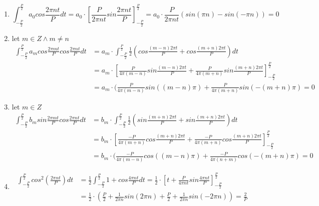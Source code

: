 \documentclass{article}
\begin{document}
    \begin{enumerate}
        \item \begin{equation*}
                \int_{-\frac{P}{2}}^{\frac{P}{2}}a_0cos\frac{2\pi nt}{P}dt
                = a_0 \cdot \left[\frac{P}{2\pi nt}sin\frac{2\pi nt}{P}\right]_{-\frac{P}{2}}^{\frac{P}{2}}
                = a_0 \cdot \frac{P}{2\pi nt}(sin(\pi n) - sin(-\pi n)) = 0
              \end{equation*}
        \item let $m \in Z \land m \neq n$
            \begin{equation*}
            \begin{split}
                \int_{-\frac{P}{2}}^{\frac{P}{2}}a_mcos\frac{2\pi mt}{P}cos\frac{2\pi nt}{P}dt 
                & = a_m \cdot \int_{-\frac{P}{2}}^{\frac{P}{2}}\frac{1}{2}\left(cos\frac{(m-n)2 \pi t}{P} + 
                cos\frac{(m+n)2 \pi t}{P}\right)dt \\
                & = a_m \cdot \left[\frac{P}{4\pi(m-n)}sin\frac{(m-n)2 \pi t}{P}
                + \frac{P}{4\pi(m+n)}sin\frac{(m+n)2 \pi t}{P}\right]_{-\frac{P}{2}}^{\frac{P}{2}} \\
                & = a_m \cdot (\frac{P}{4\pi(m-n)}sin((m-n)\pi) + \frac{P}{4\pi(m+n)}sin(-(m+n)\pi) = 0
            \end{split}
            \end{equation*}
        \item let $m \in Z$
            \begin{equation*}
            \begin{split}
                \int_{-\frac{P}{2}}^{\frac{P}{2}}b_msin\frac{2\pi mt}{P}cos\frac{2\pi nt}{P}dt 
                & = b_m \cdot \int_{-\frac{P}{2}}^{\frac{P}{2}}\frac{1}{2}\left(sin\frac{(m+n)2 \pi t}{P} + 
                sin\frac{(m+n)2 \pi t}{P}\right)dt \\
                & = b_m \cdot \left[\frac{-P}{4\pi(m+n)}cos\frac{(m+n)2 \pi t}{P}
                + \frac{-P}{4\pi(m+n)}cos\frac{(m+n)2 \pi t}{P}\right]_{-\frac{P}{2}}^{\frac{P}{2}} \\
                & = b_m \cdot (\frac{-P}{4\pi(m-n)}cos((m-n)\pi) + \frac{-P}{4\pi(n+m)}cos(-(m+n)\pi) = 0
            \end{split}
            \end{equation*}
        \item 
            \begin{equation*}
            \begin{split}
                \int_{-\frac{P}{2}}^{\frac{P}{2}}cos^2(\frac{2\pi nt}{P})dt
                & = \frac{1}{2}\int_{-\frac{P}{2}}^{\frac{P}{2}}1 + cos\frac{4\pi nt}{P}dt 
                = \frac{1}{2} \cdot \left[t + \frac{P}{4\pi nt}sin\frac{4\pi nt}{P}
                \right]_{-\frac{P}{2}}^{\frac{P}{2}} \\
                & = \frac{1}{2} \cdot \left(\frac{P}{2} + \frac{1}{2\pi n}sin(2\pi n)
                + \frac{P}{2} + \frac{1}{2\pi n}sin(-2\pi n)\right) = \frac{2}{P}
            \end{split}
            \end{equation*}
    \end{enumerate}
\end{document}
